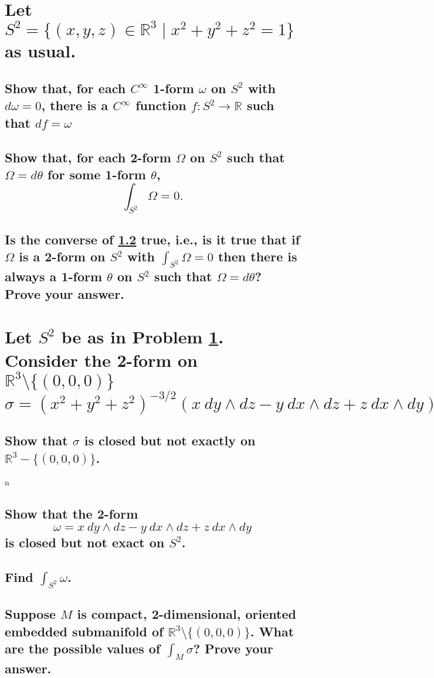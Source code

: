 \documentclass[10pt]{article}
\begin{document}
\section{Let $S^2 = \{ (x,y,z) \in \mathbb{R} ^3 \mid x^2 + y^2 +z^2 =1 \}$ as usual.}
\label{four}

\subsection{Show that, for each $C^\infty$ 1-form $\omega$ on $S^2$ with $d \omega =0$, there is a
  $C^\infty$ function $f : S^2 \to \mathbb{R} $ such that $df = \omega$}

\subsection{Show that, for each 2-form $\Omega$ on $S^2$ such that $\Omega = d \theta$ for some
  1-form $\theta$,
$$\int_{S^2} \Omega =0.$$}
\label{drh}


\subsection{Is the converse of \ref{drh} true, i.e., is it true that if $\Omega$ is a 2-form on
  $S^2$ with $\int_{S^2} \Omega =0$ then there is always a 1-form $\theta$ on $S^2$ such that
  $\Omega = d \theta$? Prove your answer.}

\section{Let $S^2$ be as in Problem \ref{four}. Consider the 2-form on $\mathbb{R}^3 \setminus
  \{(0,0,0)\}$
$$\sigma = (x^2 + y^2 + z^2)^{-3/2} (x\ dy \wedge dz - y\ dx \wedge dz + z\ dx \wedge dy).$$}

\subsection{Show that $\sigma$ is closed but not exactly on $\mathbb{R} ^3 - \{(0,0,0)\}$.}n

\subsection{Show that the 2-form
$$\omega =  x\ dy \wedge dz - y\ dx \wedge dz + z\ dx \wedge dy$$
is closed but not exact on $S^2$.}

\subsection{Find $\int_{S^2} \omega$.}

\subsection{Suppose $M$ is compact, 2-dimensional, oriented embedded submanifold of $\mathbb{R} ^3
\setminus \{(0,0,0)\}$. What are the possible values of $\int_M \sigma$? Prove your answer.}
\end{document}
